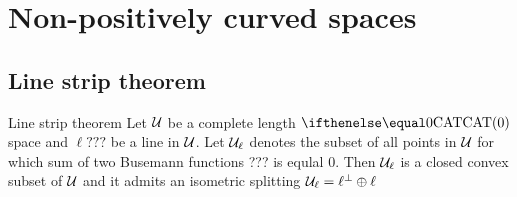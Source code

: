 \chapter{Non-positively curved spaces}

\section{Line strip theorem}

\begin{thm}{Line strip theorem}\label{split=<0}
Let $\mathcal{U}$ be a complete length $\CAT0$ space and $\ell???$ be a line in $\mathcal{U}$.
 Let $\mathcal{U}_\ell$ denotes the subset of all points in $\mathcal{U}$ for which sum of two Busemann functions ??? is equlal $0$.
Then $\mathcal{U}_\ell$ is a closed convex subset of $\mathcal{U}$ and it admits an isometric splitting $\mathcal{U}_\ell=\ell^\perp\oplus\ell$
\end{thm}
